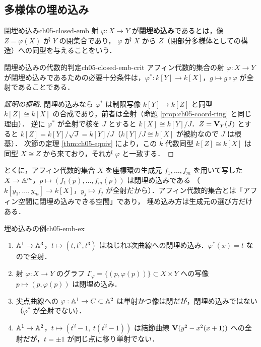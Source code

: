 \subsection{多様体の埋め込み}

\begin{mydef}{閉埋め込み}{ch05-closed-emb}
射 $\varphi:X\to Y$ が\textbf{閉埋め込み}であるとは，像 $Z=\varphi(X)$ が $Y$ の閉集合であり，
$\varphi$ が $X$ から $Z$（閉部分多様体としての構造）への同型を与えることをいう．
\end{mydef}

\begin{myprop}{閉埋め込みの代数的判定}{ch05-closed-emb-crit}
アフィン代数的集合の射 $\varphi:X\to Y$ が閉埋め込みであるための必要十分条件は，$\varphi^*:k[Y]\to k[X]$，$g\mapsto g\circ\varphi$ が全射であることである．
\end{myprop}

\begin{proof}[証明の概略]
閉埋め込みなら $\varphi^*$ は制限写像 $k[Y]\to k[Z]$ と同型 $k[Z]\cong k[X]$ の合成であり，前者は全射（命題 \ref{prop:ch05-coord-ring} と同じ理由）．
逆に $\varphi^*$ が全射で核を $J$ とすると $k[X]\cong k[Y]/J$．$Z=\mathbf{V}_Y(J)$ とすると $k[Z]=k[Y]/\sqrt J=k[Y]/J$（$k[Y]/J\cong k[X]$ が被約なので $J$ は根基）．
次節の定理 \ref{thm:ch05-equiv} により，この $k$ 代数同型 $k[Z]\cong k[X]$ は同型 $X\cong Z$ から来ており，それが $\varphi$ と一致する．
\end{proof}

とくに，アフィン代数的集合 $X$ を座標環の生成元 $f_1,\dots,f_m$ を用いて写した $X\to\mathbb{A}^m$，$p\mapsto(f_1(p),\dots,f_m(p))$ は閉埋め込みである
（$k[y_1,\dots,y_m]\to k[X]$，$y_j\mapsto f_j$ が全射だから）．アフィン代数的集合とは「アフィン空間に閉埋め込みできる空間」であり，
埋め込み方は生成元の選び方だけある．

\begin{myex}{埋め込みの例}{ch05-emb-ex}
\begin{enumerate}
  \item $\mathbb{A}^1\to\mathbb{A}^3$，$t\mapsto(t,t^2,t^3)$ はねじれ3次曲線への閉埋め込み．$\varphi^*(x)=t$ なので全射．
  \item 射 $\varphi:X\to Y$ のグラフ $\Gamma_\varphi=\{(p,\varphi(p))\}\subset X\times Y$ への写像 $p\mapsto(p,\varphi(p))$ は閉埋め込み．
  \item 尖点曲線への $\varphi:\mathbb{A}^1\to C\subset\mathbb{A}^2$ は単射かつ像は閉だが，閉埋め込みではない（$\varphi^*$ が全射でない）．
  \item $\mathbb{A}^1\to\mathbb{A}^2$，$t\mapsto(t^2-1,\ t(t^2-1))$ は結節曲線 $\mathbf{V}(y^2-x^2(x+1))$ への全射だが，$t=\pm1$ が同じ点に移り単射でない．
\end{enumerate}
\end{myex}

